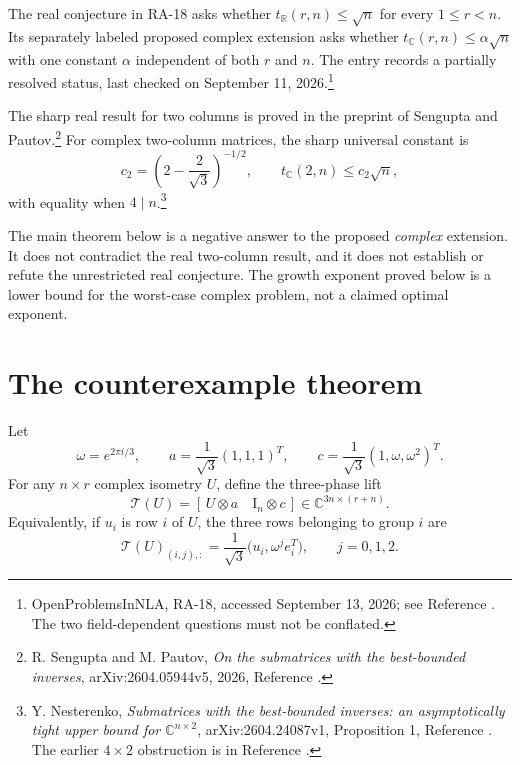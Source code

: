 \documentclass[11pt,letterpaper]{article}
\theoremstyle{definition}
\theoremstyle{remark}
\newcommand{\R}{\mathbb R}
\newcommand{\C}{\mathbb C}
\newcommand{\Id}{\mathrm I}
\newcommand{\T}{\mathcal T}
\begin{document}
The real conjecture in RA-18 asks whether $t_\R(r,n)\le\sqrt n$ for every $1\le r<n$. Its separately labeled proposed complex extension asks whether $t_\C(r,n)\le\alpha\sqrt n$ with one constant $\alpha$ independent of both $r$ and $n$. The entry records a partially resolved status, last checked on September 11, 2026.\footnote{OpenProblemsInNLA, RA-18, accessed September 13, 2026; see Reference \cite{ra18}. The two field-dependent questions must not be conflated.}

The sharp real result for two columns is proved in the preprint of Sengupta and Pautov.\footnote{R. Sengupta and M. Pautov, \emph{On the submatrices with the best-bounded inverses}, arXiv:2604.05944v5, 2026, Reference \cite{sp}.} For complex two-column matrices, the sharp universal constant is
\begin{equation}
 c_2=\left(2-\frac2{\sqrt3}\right)^{-1/2},
 \qquad t_\C(2,n)\le c_2\sqrt n,
 \label{eq:c2}
\end{equation}
with equality when $4\mid n$.\footnote{Y. Nesterenko, \emph{Submatrices with the best-bounded inverses: an asymptotically tight upper bound for $\C^{n\times2}$}, arXiv:2604.24087v1, Proposition 1, Reference \cite{complex2}. The earlier $4\times2$ obstruction is in Reference \cite{complex2024}.}

The main theorem below is a negative answer to the proposed \emph{complex} extension. It does not contradict the real two-column result, and it does not establish or refute the unrestricted real conjecture. The growth exponent proved below is a lower bound for the worst-case complex problem, not a claimed optimal exponent.

\section{The counterexample theorem}

Let
\begin{equation}
 \omega=e^{2\pi i/3},\qquad
 a=\frac1{\sqrt3}(1,1,1)^T,\qquad
 c=\frac1{\sqrt3}(1,\omega,\omega^2)^T.
 \label{eq:phases}
\end{equation}
For any $n\times r$ complex isometry $U$, define the three-phase lift
\begin{equation}
 \T(U)=\left[\,U\otimes a\quad \Id_n\otimes c\,\right]
 \in\C^{3n\times(r+n)}.
 \label{eq:lift}
\end{equation}
Equivalently, if $u_i$ is row $i$ of $U$, the three rows belonging to group $i$ are
\begin{equation}
 \T(U)_{(i,j),:}=\frac1{\sqrt3}\bigl(u_i,\omega^j e_i^T\bigr),
 \qquad j=0,1,2.
 \label{eq:liftrows}
\end{equation}
\end{document}
